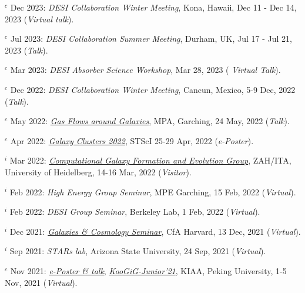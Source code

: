 \documentclass[12pt,letterpaper]{article}
\begin{document}
\begin{list}{}{\cvlist}
\item $^c$ Dec 2023:  \emph{DESI Collaboration Winter Meeting}, Kona, Hawaii, Dec 11 - Dec 14, 2023 (\textit{Virtual talk}).
\item $^c$ Jul 2023:  \emph{DESI Collaboration Summer Meeting}, Durham, UK, Jul 17 - Jul 21, 2023 (\textit{Talk}). 
\item $^c$ Mar 2023:  \emph{DESI Absorber Science Workshop}, Mar 28, 2023 (\textit{ Virtual Talk}).   
\item $^c$ Dec 2022:  \emph{DESI Collaboration Winter Meeting}, Cancun, Mexico, 5-9 Dec, 2022 (\textit{Talk}).   
\item $^c$ May 2022:  \emph{\href{https://indico.ph.tum.de/event/7018/}{Gas Flows around Galaxies}}, MPA, Garching, 24 May, 2022 (\textit{Talk}).   
\item $^c$ Apr 2022:  \emph{\href{https://www.stsci.edu/contents/events/stsci/2022/april/galaxy-clusters-2022-challenging-our-cosmological-perspectives}{Galaxy Clusters 2022}}, STScI 25-29 Apr, 2022 (\textit{e-Poster}).   
\item $^i$ Mar 2022:  \emph{\href{https://zah.uni-heidelberg.de/research-groups\#c2659}{Computational Galaxy Formation and Evolution Group}}, ZAH/ITA, University of Heidelberg, 14-16 Mar, 2022 (\textit{Visitor}).   
\item $^i$ Feb 2022:  \emph{High Energy Group Seminar}, MPE Garching, 15 Feb, 2022 (\textit{Virtual}).   
\item $^i$ Feb 2022:  \emph{DESI Group Seminar}, Berkeley Lab, 1 Feb, 2022 (\textit{Virtual}).   
\item $^i$ Dec 2021:  \emph{\href{https://pweb.cfa.harvard.edu/calendar/event/9298}{Galaxies \& Cosmology Seminar}}, CfA Harvard, 13 Dec, 2021 (\textit{Virtual}).   
\item $^i$ Sep 2021:  \textit{STARs lab}, Arizona State University, 24 Sep, 2021 (\textit{Virtual}).   

\item $^c$ Nov 2021:  \emph{\href{https://www.bilibili.com/video/BV1nv411M7w3}{e-Poster \& talk}}, \emph{\href{https://kiaa.pku.edu.cn/KooGig_junior21/Home.htm}{KooGiG-Junior'21}}, KIAA, Peking University, 1-5 Nov, 2021 (\textit{Virtual}).   


\end{list}
\end{document}
